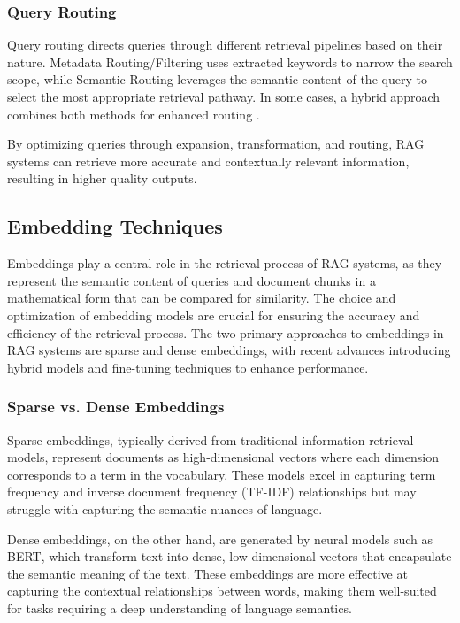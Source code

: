 \subsubsection{Query Routing}

Query routing directs queries through different retrieval pipelines based on their nature. Metadata Routing/Filtering uses extracted keywords to narrow the search scope, while Semantic Routing leverages the semantic content of the query to select the most appropriate retrieval pathway. In some cases, a hybrid approach combines both methods for enhanced routing \cite{gao2023retrieval}.\newline

By optimizing queries through expansion, transformation, and routing, RAG systems can retrieve more accurate and contextually relevant information, resulting in higher quality outputs.

\subsection{Embedding Techniques}

Embeddings play a central role in the retrieval process of RAG systems, as they represent the semantic content of queries and document chunks in a mathematical form that can be compared for similarity. The choice and optimization of embedding models are crucial for ensuring the accuracy and efficiency of the retrieval process. The two primary approaches to embeddings in RAG systems are sparse and dense embeddings, with recent advances introducing hybrid models and fine-tuning techniques to enhance performance.

\subsubsection{Sparse vs. Dense Embeddings}

Sparse embeddings, typically derived from traditional information retrieval models, represent documents as high-dimensional vectors where each dimension corresponds to a term in the vocabulary. These models excel in capturing term frequency and inverse document frequency (TF-IDF) relationships but may struggle with capturing the semantic nuances of language.

Dense embeddings, on the other hand, are generated by neural models such as BERT, which transform text into dense, low-dimensional vectors that encapsulate the semantic meaning of the text. These embeddings are more effective at capturing the contextual relationships between words, making them well-suited for tasks requiring a deep understanding of language semantics.

